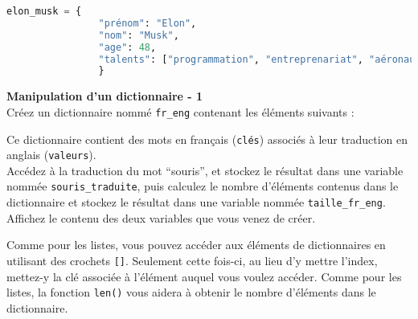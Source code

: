	 \begin{lstlisting}[language=Python]
          elon_musk = {
                "prénom": "Elon",
                "nom": "Musk",
                "age": 48,
                "talents": ["programmation", "entreprenariat", "aéronautique"]
				}   \end{lstlisting}
				
	\begin{Exercice}[5 minutes] \textbf{Manipulation d'un dictionnaire - 1}\\
       Créez un dictionnaire nommé \lstinline{fr_eng} contenant les éléments suivants :
       
       
       
       Ce dictionnaire contient des mots en français (\lstinline{clés}) associés à leur traduction en anglais (\lstinline{valeurs}). \\
       
       Accédez à la traduction du mot ``souris'', et stockez le résultat dans une variable nommée \lstinline{souris_traduite}, puis calculez le nombre d'éléments contenus dans le dictionnaire et stockez le résultat dans une variable nommée \lstinline{taille_fr_eng}. Affichez le contenu des deux variables que vous venez de créer.
    
        \begin{conseil}
            Comme pour les listes, vous pouvez accéder aux éléments de dictionnaires en utilisant des crochets \lstinline{[]}. Seulement cette fois-ci, au lieu d'y mettre l'index, mettez-y la clé associée à l'élément auquel vous voulez accéder. Comme pour les listes, la fonction \lstinline{len()} vous aidera à obtenir le nombre d'éléments dans le dictionnaire.
        \end{conseil}
        
        \begin{solution}
             
        \end{solution}
    \end{Exercice}
    
